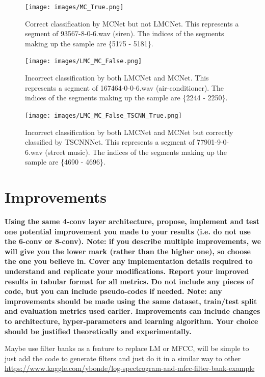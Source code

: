 \documentclass[conference]{IEEEtran}
\begin{document}
\begin{figure}[h]
    \centering
    \texttt{[image: images/MC\_True.png]}
    \caption{Correct classification by MCNet but not LMCNet. This represents a segment of 93567-8-0-6.wav (siren). The indices of the segments making up the sample are \{5175 - 5181\}.}
    \label{fig:MC_True}
\end{figure}{}

\begin{figure}[h]
    \centering
    \texttt{[image: images/LMC\_MC\_False.png]}
    \caption{Incorrect classification by both LMCNet and MCNet. This represents a segment of 167464-0-0-6.wav (air-conditioner). The indices of the segments making up the sample are \{2244 - 2250\}.}
    \label{fig:LMC_MC_False}
\end{figure}{}

\begin{figure}[h]
    \centering
    \texttt{[image: images/LMC\_MC\_False\_TSCNN\_True.png]}
    \caption{Incorrect classification by both LMCNet and MCNet but correctly classified by TSCNNNet. This represents a segment of 77901-9-0-6.wav (street music). The indices of the segments making up the sample are \{4690 - 4696\}.}
    \label{fig:LMC_MC_False_TSCNN_True}
\end{figure}{}

\section{Improvements}
\textbf{Using the same 4-conv layer architecture, propose, implement and test one potential improvement you made to your results (i.e. do not use the 6-conv or 8-conv). Note: if you describe multiple improvements, we will give you the lower mark (rather than the higher one), so choose the one you believe in. Cover any implementation details required to understand and replicate your modifications. Report your improved results in tabular format for all metrics. Do not include any pieces of code, but you can include pseudo-codes if needed. Note: any improvements should be made using the same dataset, train/test split and evaluation metrics used earlier. Improvements can include changes to architecture, hyper-parameters and learning algorithm. Your choice should be justified theoretically and experimentally. }

Maybe use filter banks as a feature to replace LM or MFCC, will be simple to just add the code to generate filters and just do it in a similar way to other 
\href{code here}{https://www.kaggle.com/ybonde/log-spectrogram-and-mfcc-filter-bank-example}
\end{document}
